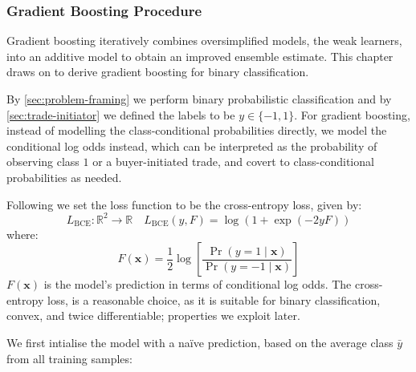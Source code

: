 \subsubsection{Gradient Boosting
    Procedure}\label{sec:gradient-boosting-procedure}

Gradient boosting iteratively combines oversimplified models, the weak learners, into an additive model to obtain an improved ensemble estimate. This chapter draws on \textcite[][9]{friedmanGreedyFunctionApproximation2001} to derive gradient boosting for binary classification.

By \cref{sec:problem-framing} we perform binary probabilistic classification and by \cref{sec:trade-initiator} we defined the labels to be $y \in \{-1,1\}$. For gradient boosting, instead of modelling the class-conditional probabilities directly, we model the conditional log odds instead, which can be interpreted as the probability of observing class $1$ or a buyer-initiated trade, and covert to class-conditional probabilities as needed.


Following \textcite[][9]{friedmanStochasticGradientBoosting2002} we set the loss function to be the cross-entropy loss, given by:
\begin{equation}
    L_{\mathrm{BCE}} \colon \mathbb{R}^2 \to \mathbb{R} \quad L_{\mathrm{BCE}}(y, F) = \log(1+\exp(-2yF))
    \label{eq:cross-entropy-loss}
\end{equation}
where:
\begin{equation}
    F(\mathbf{x}) = \frac{1}{2} \log \left[\frac{\Pr(y=1\mid \mathbf{x})}{\Pr(y=-1\mid \mathbf{x})}\right]
    \label{eq:logits-gbm}
\end{equation}
$F(\mathbf{x})$ is the model's prediction in terms of conditional log odds. The cross-entropy loss, is a reasonable choice, as it is suitable for binary classification, convex, and twice differentiable; properties we exploit later.

We first intialise the model with a naïve prediction, based on the average class $\bar{y}$ from all training samples:

